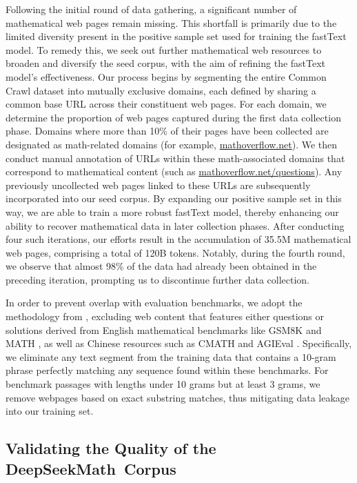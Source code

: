 \begin{itemize}[topsep=0pt]
Following the initial round of data gathering, a significant number of mathematical web pages remain missing. This shortfall is primarily due to the limited diversity present in the positive sample set used for training the fastText model. To remedy this, we seek out further mathematical web resources to broaden and diversify the seed corpus, with the aim of refining the fastText model's effectiveness. Our process begins by segmenting the entire Common Crawl dataset into mutually exclusive domains, each defined by sharing a common base URL across their constituent web pages. For each domain, we determine the proportion of web pages captured during the first data collection phase. Domains where more than 10\% of their pages have been collected are designated as math-related domains (for example, \url{mathoverflow.net}). We then conduct manual annotation of URLs within these math-associated domains that correspond to mathematical content (such as \url{mathoverflow.net/questions}). Any previously uncollected web pages linked to these URLs are subsequently incorporated into our seed corpus. By expanding our positive sample set in this way, we are able to train a more robust fastText model, thereby enhancing our ability to recover mathematical data in later collection phases. After conducting four such iterations, our efforts result in the accumulation of 35.5M mathematical web pages, comprising a total of 120B tokens. Notably, during the fourth round, we observe that almost 98\% of the data had already been obtained in the preceding iteration, prompting us to discontinue further data collection.

In order to prevent overlap with evaluation benchmarks, we adopt the methodology from \cite{deepseek-coder}, excluding web content that features either questions or solutions derived from English mathematical benchmarks like GSM8K \citep{gsm8k} and MATH \citep{MATH}, as well as Chinese resources such as CMATH \citep{wei2023cmath} and AGIEval \citep{agieval}. Specifically, we eliminate any text segment from the training data that contains a 10-gram phrase perfectly matching any sequence found within these benchmarks. For benchmark passages with lengths under 10 grams but at least 3 grams, we remove webpages based on exact substring matches, thus mitigating data leakage into our training set.

\subsection{Validating the Quality of the DeepSeekMath~Corpus}


\end{itemize}
